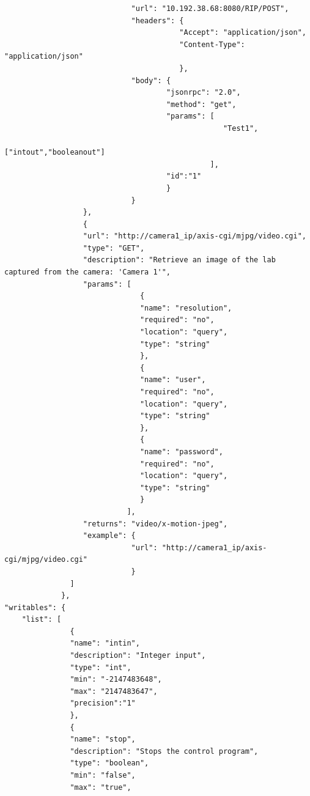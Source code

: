 \begin{lstlisting}
                             "url": "10.192.38.68:8080/RIP/POST",
                             "headers": {
                                        "Accept": "application/json",
                                        "Content-Type": "application/json"
                                        },
                             "body": {
                                     "jsonrpc": "2.0",
                                     "method": "get",
                                     "params": [
                                                  "Test1",
                                                  ["intout","booleanout"]
                                               ],
                                     "id":"1"
                                     }
                             }
                  },
                  {
                  "url": "http://camera1_ip/axis-cgi/mjpg/video.cgi",
                  "type": "GET",
                  "description": "Retrieve an image of the lab captured from the camera: 'Camera 1'",
                  "params": [
                               {
                               "name": "resolution",
                               "required": "no",
                               "location": "query",
                               "type": "string"
                               },
                               {
                               "name": "user",
                               "required": "no",
                               "location": "query",
                               "type": "string"
                               },
                               {
                               "name": "password",
                               "required": "no",
                               "location": "query",
                               "type": "string"
                               }
                            ],
                  "returns": "video/x-motion-jpeg",
                  "example": {
                             "url": "http://camera1_ip/axis-cgi/mjpg/video.cgi"
                             }
               ]
             },
"writables": {
    "list": [
               {
               "name": "intin",
               "description": "Integer input",
               "type": "int",
               "min": "-2147483648",
               "max": "2147483647",
               "precision":"1"
               },
               {
               "name": "stop",
               "description": "Stops the control program",
               "type": "boolean",
               "min": "false",
               "max": "true",

\end{lstlisting}
